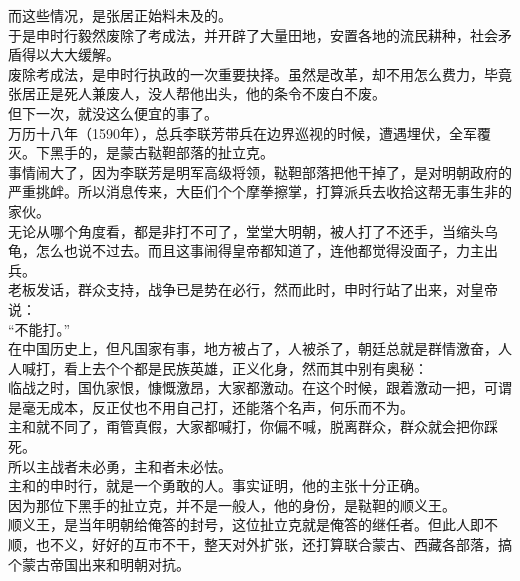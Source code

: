 \begin{multicols}{\theparacolNo}
而这些情况，是张居正始料未及的。\\

于是申时行毅然废除了考成法，并开辟了大量田地，安置各地的流民耕种，社会矛盾得以大大缓解。\\

废除考成法，是申时行执政的一次重要抉择。虽然是改革，却不用怎么费力，毕竟张居正是死人兼废人，没人帮他出头，他的条令不废白不废。\\

但下一次，就没这么便宜的事了。\\

万历十八年（1590年），总兵李联芳带兵在边界巡视的时候，遭遇埋伏，全军覆灭。下黑手的，是蒙古鞑靼部落的扯立克。\\

事情闹大了，因为李联芳是明军高级将领，鞑靼部落把他干掉了，是对明朝政府的严重挑衅。所以消息传来，大臣们个个摩拳擦掌，打算派兵去收拾这帮无事生非的家伙。\\

无论从哪个角度看，都是非打不可了，堂堂大明朝，被人打了不还手，当缩头乌龟，怎么也说不过去。而且这事闹得皇帝都知道了，连他都觉得没面子，力主出兵。\\

老板发话，群众支持，战争已是势在必行，然而此时，申时行站了出来，对皇帝说：\\

“不能打。”\\

在中国历史上，但凡国家有事，地方被占了，人被杀了，朝廷总就是群情激奋，人人喊打，看上去个个都是民族英雄，正义化身，然而其中别有奥秘：\\

临战之时，国仇家恨，慷慨激昂，大家都激动。在这个时候，跟着激动一把，可谓是毫无成本，反正仗也不用自己打，还能落个名声，何乐而不为。\\

主和就不同了，甭管真假，大家都喊打，你偏不喊，脱离群众，群众就会把你踩死。\\

所以主战者未必勇，主和者未必怯。\\

主和的申时行，就是一个勇敢的人。事实证明，他的主张十分正确。\\

因为那位下黑手的扯立克，并不是一般人，他的身份，是鞑靼的顺义王。\\

顺义王，是当年明朝给俺答的封号，这位扯立克就是俺答的继任者。但此人即不顺，也不义，好好的互市不干，整天对外扩张，还打算联合蒙古、西藏各部落，搞个蒙古帝国出来和明朝对抗。\\


\end{multicols}
